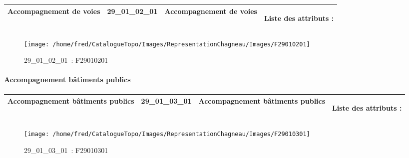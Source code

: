 \documentclass[12pt,titlepage,oneside]{book}
\begin{document}
\renewcommand{\arraystretch}{1.2}
\begin{supertabular}{|p{10cm}|c|p{13cm}|p{12cm}|}
 Accompagnement de voies & 29\_01\_02\_01 & Accompagnement de voies & Liste des attributs :
\begin{enumerate}
\end{enumerate}
\\
\hline
\end{supertabular}
\begin{figure}[h!]
  \hfill         %
  \begin{minipage}[t]{3cm}
    \begin{center}
      \texttt{[image: /home/fred/CatalogueTopo/Images/RepresentationChagneau/Images/F29010201]}
      \caption[~29\_01\_02\_01]{\small{29\_01\_02\_01~:} \tiny{F29010201}}\label{F29010201}
    \end{center}
  \end{minipage}
\end{figure}


\paragraph{Accompagnement bâtiments publics}
\noindent
\vspace{\baselineskip}

\renewcommand{\arraystretch}{1.2}
\begin{supertabular}{|p{10cm}|c|p{13cm}|p{12cm}|}
 Accompagnement bâtiments publics & 29\_01\_03\_01 & Accompagnement bâtiments publics & Liste des attributs :
\begin{enumerate}
\end{enumerate}
\\
\hline
\end{supertabular}
\begin{figure}[h!]
  \hfill         %
  \begin{minipage}[t]{3cm}
    \begin{center}
      \texttt{[image: /home/fred/CatalogueTopo/Images/RepresentationChagneau/Images/F29010301]}
      \caption[~29\_01\_03\_01]{\small{29\_01\_03\_01~:} \tiny{F29010301}}\label{F29010301}
    \end{center}
  \end{minipage}
\end{figure}
\end{document}
